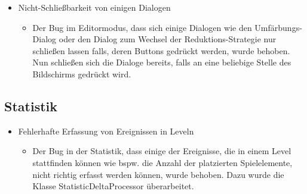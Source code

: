 \begin{itemize}
\item Nicht-Schließbarkeit von einigen Dialogen
\begin{itemize} 
\item Der Bug im Editormodus, dass sich einige Dialogen wie den Umfärbungs-Dialog oder den Dialog zum Wechsel der Reduktions-Strategie nur schließen lassen falls, deren Buttons gedrückt werden, wurde behoben. Nun schließen sich die Dialoge bereits, falls an eine beliebige Stelle des Bildschirms gedrückt wird.
	\end{itemize}
\end{itemize}

\subsection{Statistik}
\begin{itemize}
\item Fehlerhafte Erfassung von Ereignissen in Leveln
\begin{itemize} 
\item Der Bug in der Statistik, dass einige der Ereignisse, die in einem Level stattfinden können wie bspw. die Anzahl der platzierten Spielelemente, nicht richtig erfasst werden können, wurde behoben. Dazu wurde die Klasse StatisticDeltaProcessor überarbeitet.
	\end{itemize}
\end{itemize}